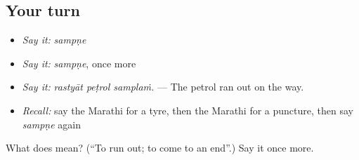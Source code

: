 \subsection*{Your turn}
\begin{itemize}
\raggedright
  \item \emph{Say it:} \emph{sampṇe}
  \item \emph{Say it:} \emph{sampṇe}, once more
  \item \emph{Say it:} \emph{rastyāt peṭrol samplaṁ.} — The petrol ran out on the way.
  \item \emph{Recall:} say the Marathi for a tyre, then the Marathi for a puncture, then say \emph{sampṇe} again
\end{itemize}

\begin{tcolorbox}[breakable,colback=teal!4,colframe=teal!35!black,title={Before you move on}]
What does  mean? (\textquotedblleft{}To run out; to come to an end\textquotedblright{}.) Say it once more.
\end{tcolorbox}
